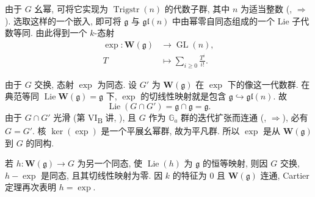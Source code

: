 
由于 \(G\) 幺幂, 可将它实现为 \(\operatorname{Trigstr}(n)\) 的代数子群,
其中 \(n\) 为适当整数
(,
\(\Rightarrow\)).
选取这样的一个嵌入, 即可将 \(\mathfrak g\) 与 \(\mathfrak{gl}(n)\)
中由幂零自同态组成的一个 Lie 子代数等同. 由此得到一个 \(k\)-态射
\[
  \begin{aligned}
  \exp:\mathbf W(\mathfrak g)&\longrightarrow
    \operatorname{GL}(n),\\
  T&\longmapsto\sum_{i\geq0}\frac{T^i}{i!}.
  \end{aligned}
\]

由于 \(G\) 交换, 态射 \(\exp\) 为同态.
设 \(G'\) 为 \(\mathbf W(\mathfrak g)\) 在 \(\exp\) 下的像这一代数群.
在典范等同 \(\operatorname{Lie}\mathbf W(\mathfrak g)=\mathfrak g\) 下,
\(\exp\) 的切线性映射就是包含 \(\mathfrak g\hookrightarrow\mathfrak{gl}(n)\). 故
\[
  \operatorname{Lie}(G\cap G')
  =\mathfrak g\cap\mathfrak g=\mathfrak g.
\]
由于 \(G\cap G'\) 光滑 (第 VI\textsubscript{B} 讲, ),
且 \(G\) 作为 \(\mathbb G_a\) 群的迭代扩张而连通
(,
\(\Rightarrow\)),
必有 \(G=G'\). 核 \(\ker(\exp)\) 是一个平展幺幂群, 故为平凡群.
所以 \(\exp\) 是从 \(\mathbf W(\mathfrak g)\) 到 \(G\) 的同构.

若 \(h:\mathbf W(\mathfrak g)\to G\) 为另一个同态,
使 \(\operatorname{Lie}(h)\) 为 \(\mathfrak g\) 的恒等映射,
则因 \(G\) 交换, \(h-\exp\) 是同态, 且其切线性映射为零.
因 \(k\) 的特征为 \(0\) 且 \(\mathbf W(\mathfrak g)\) 连通,
Cartier 定理再次表明 \(h=\exp\).

